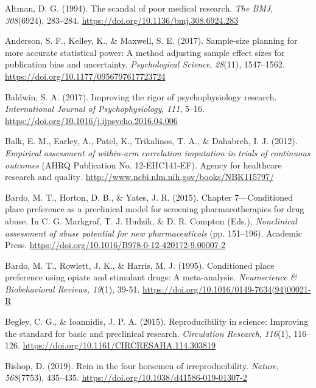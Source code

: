 \documentclass[authordate, meta, issue]{jote-new-article}
\begin{document}
	Altman, D. G. (1994). The scandal of poor medical research. \emph{The BMJ}, \emph{308}(6924), 283--284. \url{https://doi.org/10.1136/bmj.308.6924.283}



	Anderson, S. F., Kelley, K., \& Maxwell, S. E. (2017). Sample-size planning for more accurate statistical power: A method adjusting sample effect sizes for publication bias and uncertainty. \emph{Psychological Science}, \emph{28}(11), 1547--1562. \url{https://doi.org/10.1177/0956797617723724}



	Baldwin, S. A. (2017). Improving the rigor of psychophysiology research. \emph{International Journal of Psychophysiology}, \emph{111}, 5--16. \url{https://doi.org/10.1016/j.ijpsycho.2016.04.006}



	Balk, E. M., Earley, A., Patel, K., Trikalinos, T. A., \& Dahabreh, I. J. (2012).\emph{\textbf{ }}\emph{Empirical assessment of within-arm correlation imputation in trials of continuous outcomes} (AHRQ Publication No. 12-EHC141-EF). Agency for healthcare research and quality\emph{.} \url{http://www.ncbi.nlm.nih.gov/books/NBK115797/}



	Bardo, M. T., Horton, D. B., \& Yates, J. R. (2015). Chapter 7—Conditioned place preference as a preclinical model for screening pharmacotherapies for drug abuse. In C. G. Markgraf, T. J. Hudzik, \& D. R. Compton (Eds.), \emph{Nonclinical assessment of abuse potential for new pharmaceuticals} (pp. 151--196). Academic Press. \url{https://doi.org/10.1016/B978-0-12-420172-9.00007-2}



	Bardo, M. T., Rowlett, J. K., \& Harris, M. J. (1995). Conditioned place preference using opiate and stimulant drugs: A meta-analysis\emph{.} \emph{Neuroscience \& Biobehavioral Reviews, 19}(1), 39-51. \url{https://doi.org/10.1016/0149-7634(94)00021-R}



	Begley, C. G., \& Ioannidis, J. P. A. (2015). Reproducibility in science: Improving the standard for basic and preclinical research. \emph{Circulation Research}, \emph{116}(1), 116--126. \url{https://doi.org/10.1161/CIRCRESAHA.114.303819}



	Bishop, D. (2019). Rein in the four horsemen of irreproducibility. \emph{Nature}, \emph{568}(7753), 435--435. \url{https://doi.org/10.1038/d41586-019-01307-2}
\end{document}
